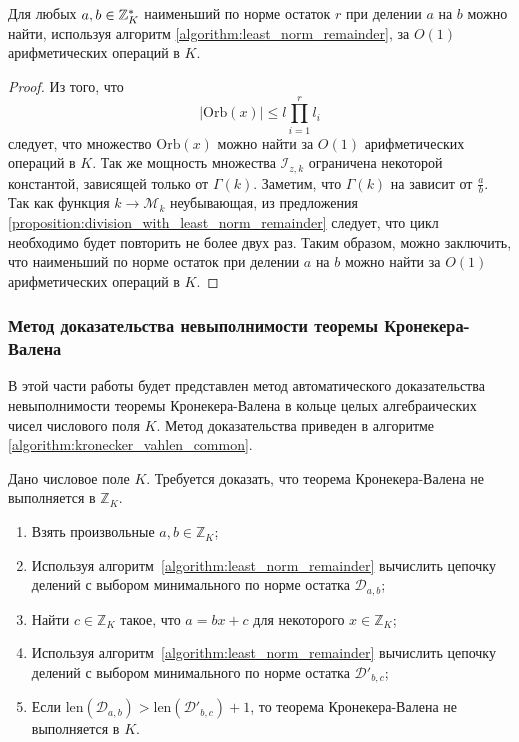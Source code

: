 \documentclass[_00_dissertation.tex]{subfiles}
\begin{document}
\begin{statement}
    Для любых $a, b \in \mathbb{Z}_K^{*}$ наименьший по норме остаток $r$ при делении $a$ на $b$ можно найти, используя алгоритм \ref{algorithm:least_norm_remainder}, за $O(1)$ арифметических операций в $K$.
\end{statement}
\begin{proof}
    Из того, что
    \begin{equation*}
        |\textrm{Orb}(x)| \le l\prod\limits_{i=1}^r l_i
    \end{equation*}
    следует, что множество $\textrm{Orb}(x)$ можно найти за $O(1)$ арифметических операций в $K$.
    Так же мощность множества $\mathcal{I}_{z, k}$ ограничена некоторой константой, зависящей только от $\Gamma(k)$.
    Заметим, что $\Gamma(k)$ на зависит от $\frac{a}{b}$.
    Так как функция $k \to \mathcal{M}_k$ неубывающая, из предложения \ref{proposition:division_with_least_norm_remainder} следует, что цикл необходимо будет повторить не более двух раз.
    Таким образом, можно заключить, что наименьший по норме остаток при делении $a$ на $b$ можно найти за $O(1)$ арифметических операций в $K$.
\end{proof}

\subsubsection{Метод доказательства невыполнимости теоремы Кронекера-Валена}

В этой части работы будет представлен метод автоматического доказательства невыполнимости теоремы Кронекера-Валена в кольце целых алгебраических чисел числового поля $K$.
Метод доказательства приведен в алгоритме \ref{algorithm:kronecker_vahlen_common}.

\begin{algorithm}\label{algorithm:kronecker_vahlen_common}
    Дано числовое поле $K$.
    Требуется доказать, что теорема Кронекера-Валена не выполняется в $\mathbb{Z}_K$.
    
    \begin{enumerate}
        \item Взять произвольные $a, b \in \mathbb{Z}_K$;

        \item Используя алгоритм~\ref{algorithm:least_norm_remainder} вычислить цепочку делений с выбором минимального по норме остатка $\mathcal{D}_{a, b}$;

        \item Найти $c \in \mathbb{Z}_K$ такое, что $a = bx + c$ для некоторого $x \in \mathbb{Z}_K$;

        \item Используя алгоритм~\ref{algorithm:least_norm_remainder} вычислить цепочку делений с выбором минимального по норме остатка $\mathcal{D}'_{b,c}$;

        \item Если $\textrm{len}(\mathcal{D}_{a, b}) > \textrm{len}(\mathcal{D}'_{b, c}) + 1$, то теорема Кронекера-Валена не выполняется в $K$.
    \end{enumerate}
\end{algorithm}
\end{document}
